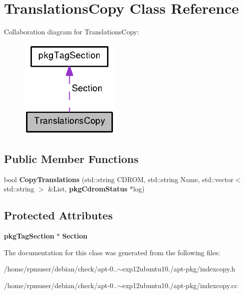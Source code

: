 \section{\-Translations\-Copy \-Class \-Reference}
\label{classTranslationsCopy}


\-Collaboration diagram for \-Translations\-Copy\-:
\nopagebreak
\begin{figure}[H]
\begin{center}
\leavevmode
\includegraphics[width=140pt]{classTranslationsCopy__coll__graph}
\end{center}
\end{figure}
\subsection*{\-Public \-Member \-Functions}
\begin{DoxyCompactItemize}
\item 
bool {\bfseries \-Copy\-Translations} (std\-::string \-C\-D\-R\-O\-M, std\-::string \-Name, std\-::vector$<$ std\-::string $>$ \&\-List, {\bf pkg\-Cdrom\-Status} $\ast$log)\label{classTranslationsCopy_a8afd344fd71a70fcaed4e21aabf01b0d}

\end{DoxyCompactItemize}
\subsection*{\-Protected \-Attributes}
\begin{DoxyCompactItemize}
\item 
{\bf pkg\-Tag\-Section} $\ast$ {\bfseries \-Section}\label{classTranslationsCopy_a076d8619a9760c7e1bcb3bc49711fedf}

\end{DoxyCompactItemize}


\-The documentation for this class was generated from the following files\-:\begin{DoxyCompactItemize}
\item 
/home/rpmuser/debian/check/apt-\/0..$\sim$exp12ubuntu10./apt-\/pkg/indexcopy.\-h\item 
/home/rpmuser/debian/check/apt-\/0..$\sim$exp12ubuntu10./apt-\/pkg/indexcopy.\-cc\end{DoxyCompactItemize}
